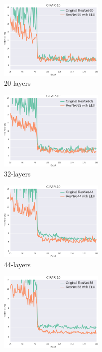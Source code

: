 \documentclass[10pt,twocolumn,letterpaper]{article}
\begin{document}
\begin{figure}
    \centering
    \begin{subfigure}{.33\linewidth}
        \centering
        \includegraphics[width=5cm]{TestError20}
        \caption{20-layers}
        \label{fig:Cifar10TestError20}
    \end{subfigure}
    \begin{subfigure}{.33\linewidth}
        \centering
        \includegraphics[width=5cm]{TestError32}
        \caption{32-layers}
        \label{fig:Cifar10TestError32}
    \end{subfigure}
    \begin{subfigure}{.33\linewidth}
        \centering
        \includegraphics[width=5cm]{TestError44}
        \caption{44-layers}
        \label{fig:Cifar10TestError44}
    \end{subfigure}
    \begin{subfigure}{.4\textwidth}
        \centering
        \includegraphics[width=5cm]{TestError56}

\end{subfigure}
\end{figure}
\end{document}
